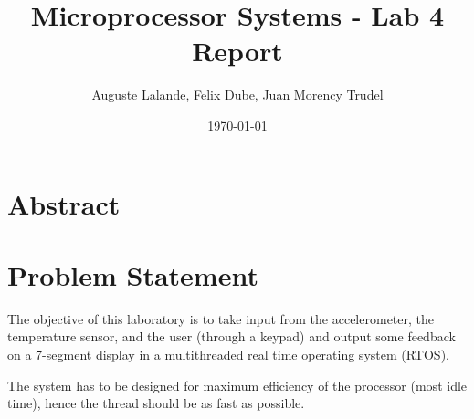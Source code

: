\documentclass[12pt]{article}
\title{Microprocessor Systems - Lab 4 Report}
\author{Auguste Lalande, Felix Dube, Juan Morency Trudel}
\date{\today}
\begin{document}
\maketitle
\clearpage

\tableofcontents
\clearpage

\section{Abstract}


\section{Problem Statement}
The objective of this laboratory is to take input from the accelerometer, the temperature sensor, and the user (through a keypad) and output some feedback on a 7-segment display in a multithreaded real time operating system (RTOS). 

The system has to be designed for maximum efficiency of the processor (most idle time), hence the thread should be as fast as possible.
\end{document}
